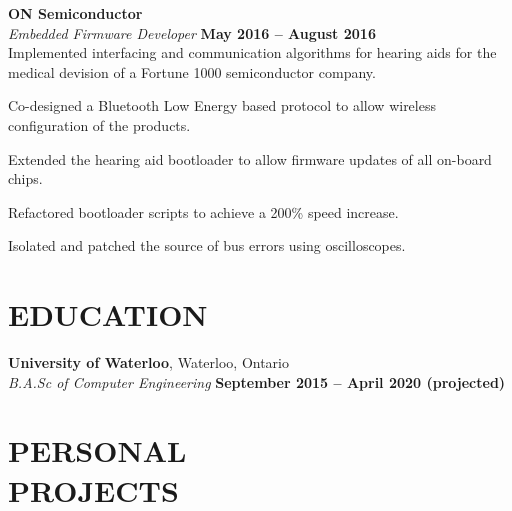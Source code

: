 \documentclass[margin,line]{resume}
\begin{document}
\begin{resume}
    \vspace{1mm}
    \textbf{\listing ON Semiconductor} \vspace{2mm}\\\vspace{1mm}%
    \textsl{Embedded Firmware Developer} \hfill \textbf{May 2016 -- August 2016}\\
    Implemented interfacing and communication algorithms for hearing aids for the medical devision of a Fortune 1000 semiconductor company. \\
    \begin{tightemize}
    \item Co-designed a Bluetooth Low Energy based protocol to allow wireless configuration of the products.
    \item Extended the hearing aid bootloader to allow firmware updates of all on-board chips.
    \item Refactored bootloader scripts to achieve a 200\% speed increase.
    \item Isolated and patched the source of bus errors using oscilloscopes.\\
    \end{tightemize}

\vspace{-1mm}
\sectionline

    \section{\mysidestyle \textbf{\large{E}\small{DUCATION}}}

    \textbf{\listing University of Waterloo}, Waterloo, Ontario\vspace{1mm}\\
    \textsl{B.A.Sc of Computer Engineering} \hfill \textbf{September 2015 -- April 2020 (projected)}\vspace{-3mm}\\\vspace{-1mm}%

\sectionline

    \section{\mysidestyle \textbf{\large{P}\small{ERSONAL}\\ \large{P}\small{ROJECTS}}}


\end{resume}
\end{document}
